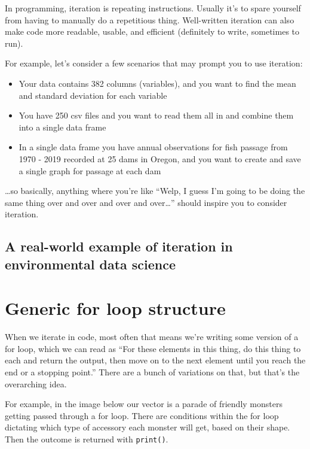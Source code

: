 \documentclass[
]{book}
\providecommand{\tightlist}{%
  \setlength{\itemsep}{0pt}\setlength{\parskip}{0pt}}
\begin{document}
In programming, iteration is repeating instructions. Usually it's to spare yourself from having to manually do a repetitious thing. Well-written iteration can also make code more readable, usable, and efficient (definitely to write, sometimes to run).

For example, let's consider a few scenarios that may prompt you to use iteration:

\begin{itemize}
\tightlist
\item
  Your data contains 382 columns (variables), and you want to find the mean and standard deviation for each variable
\item
  You have 250 csv files and you want to read them all in and combine them into a single data frame
\item
  In a single data frame you have annual observations for fish passage from 1970 - 2019 recorded at 25 dams in Oregon, and you want to create and save a single graph for passage at each dam
\end{itemize}

\ldots so basically, anything where you're like ``Welp, I guess I'm going to be doing the same thing over and over and over and over\ldots{}'' should inspire you to consider iteration.

\hypertarget{a-real-world-example-of-iteration-in-environmental-data-science}{%
\subsection{A real-world example of iteration in environmental data science}\label{a-real-world-example-of-iteration-in-environmental-data-science}}

\hypertarget{generic-for-loop-structure}{%
\section{Generic for loop structure}\label{generic-for-loop-structure}}

When we iterate in code, most often that means we're writing some version of a for loop, which we can read as ``For these elements in this thing, do this thing to each and return the output, then move on to the next element until you reach the end or a stopping point.'' There are a bunch of variations on that, but that's the overarching idea.

For example, in the image below our vector is a parade of friendly monsters getting passed through a for loop. There are conditions within the for loop dictating which type of accessory each monster will get, based on their shape. Then the outcome is returned with \texttt{print()}.
\end{document}
